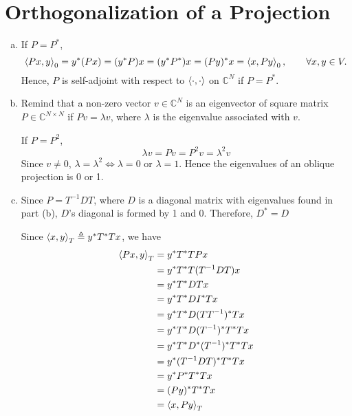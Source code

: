 \section{Orthogonalization of a Projection}\label{sec:part3}

\begin{enumerate}[(a)]
\item If $P = P^*$,
\[\left\langle Px, y \right\rangle_0 = y^* (Px) = (y^*P)x = (y^*P^*)x = (Py)^*x = \left\langle x, Py \right\rangle_0, \qquad \forall x, y \in V.\]
Hence, $P$ is self-adjoint with respect to $\left\langle \cdot, \cdot \right\rangle$ on $\mathbb{C}^N$ if $P = P^*$.

\item Remind that a non-zero vector $v \in \mathbb{C}^N$ is an eigenvector of square matrix $P \in \mathbb{C}^{N\times N}$ if $Pv = \lambda v$, where $\lambda$ is the eigenvalue associated with $v$. 

If $P = P^2$,
\[\lambda v = P v = P^2 v = \lambda^2 v\]
Since $v \neq 0$, $\lambda = \lambda^2 \Leftrightarrow \lambda = 0 \text{ or } \lambda = 1$. Hence the eigenvalues of an oblique projection is 0 or 1.

\item Since $P = T^{-1}DT$, where $D$ is a diagonal matrix with eigenvalues found in part (b), $D$'s diagonal is formed by 1 and 0. Therefore, $D^* = D$

Since $\left\langle x, y \right\rangle_T \triangleq y^*T^*Tx$, we have
\begin{align*}
	\left\langle Px, y \right\rangle_T
	&= y^* T^* T P x \\
	&= y^* T^* T (T^{-1} D T) x \\
	&= y^* T^* D T x \\
	&= y^* T^* D I^* T x \\
	&= y^* T^* D (T T^{-1})^* T x \\
	&= y^* T^* D (T^{-1})^* T^* T x \\
	&= y^* T^* D^* (T^{-1})^* T^* T x \\
	&= y^* (T^{-1}DT)^* T^* T x \\
	&= y^* P^* T^* T x \\
	&= (Py)^* T^* T x \\
	&= \left\langle x, Py \right\rangle_T
\end{align*}


\end{enumerate}
